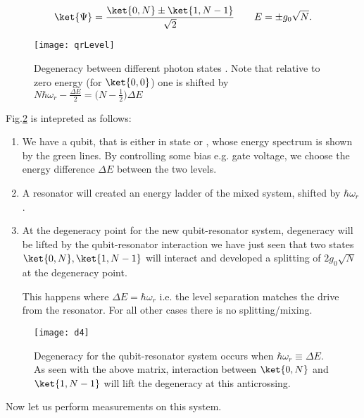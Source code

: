 \begin{equation}
  \ket{\Psi} = \frac{\ket{0,N}\pm\ket{1,N-1}}{\sqrt{2}} \qquad E = \pm{g_0\sqrt{N}}.
\end{equation}

\begin{figure}
  \centering%
  \texttt{[image: qrLevel]}
  \caption{Degeneracy between different photon states \label{qrLevel}.  Note that
    relative  to   zero  energy   (for  $   \ket{0,0}  $)   one  is   shifted  by
    $ N\hbar\omega_r-\frac{\Delta E}{2}=\bigg(N-\frac{1}{2}\bigg)\Delta E $}
\end{figure}

Fig.\ref{qrDresssed} is intepreted as follows:

\begin{enumerate}
\item We have a qubit, that is either in state  or , whose energy
  spectrum is  shown by  the green  lines.  By controlling  some bias  e.g.  gate
  voltage, we choose the energy difference $ \Delta E $ between the two levels.
\item A resonator will  created an energy ladder of the  mixed system, shifted by
  $ \hbar\omega_r $.
\item At the degeneracy point for the new qubit-resonator system, degeneracy will
  be lifted  by the qubit-resonator interaction  \ira we have just  seen that two
  states $  \ket{0,N}, \ket{1,N-1} $ will  interact and developed a  splitting of
  $ 2g_0\sqrt{N} $ at the degeneracy point.
  \begin{framed}\noindent
    This  happens where  $ \Delta  E =\hbar\omega_r$  i.e.  the  level separation
    matches  the drive  from the  resonator.   For all  other cases  there is  no
    splitting/mixing.
  \end{framed}
\end{enumerate}

\begin{figure}[h]
  \centering%
  \texttt{[image: d4]}
  \caption{Degeneracy    for    the    qubit-resonator   system    occurs    when
    $ \hbar\omega_r\equiv\Delta E $.  As  seen with the above matrix, interaction
    between $\ket{0,N}$  and $  \ket{1,N-1} $  will lift  the degeneracy  at this
    anticrossing.\label{qrDresssed}}
\end{figure}

Now let us perform measurements on this system.

